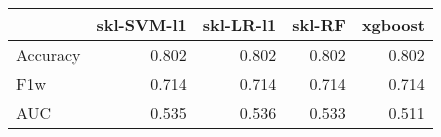 \begin{tabular}{lrrrr}
\toprule
{} &  skl-SVM-l1 &  skl-LR-l1 &  skl-RF &  xgboost \\
\midrule
Accuracy &       0.802 &      0.802 &   0.802 &    0.802 \\
F1w      &       0.714 &      0.714 &   0.714 &    0.714 \\
AUC      &       0.535 &      0.536 &   0.533 &    0.511 \\
\bottomrule
\end{tabular}
